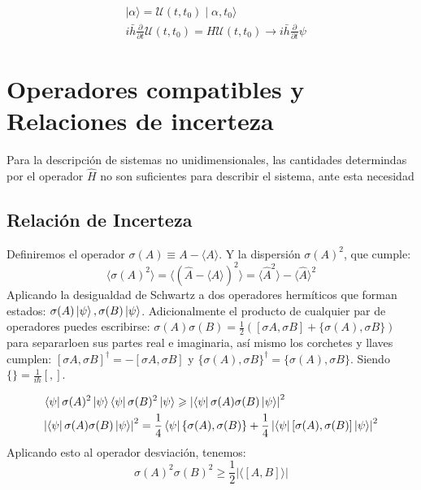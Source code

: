 \documentclass{report}
\begin{document}

\begin{align*}
    &\mid \alpha \rangle = \mathcal{U}(t,t_0) \mid \alpha,t_0 \rangle\\
    &i \bar{h}\frac{\partial}{\partial t} \mathcal{U}(t,t_0) =H\mathcal{U}(t,t_0) \rightarrow i \bar{h} \frac{\partial}{\partial t}\psi
\end{align*}

\chapter{Operadores compatibles y Relaciones de incerteza}
Para la descripción de sistemas no unidimensionales, las cantidades determindas por el operador $\hat{H}$ no son suficientes para describir el sistema, ante esta necesidad 
\section{Relación de Incerteza}
Definiremos el operador $\sigma(A)\equiv A- \langle A \rangle$. Y la dispersión $\sigma(A)^2$, que cumple:
\[
  \langle\sigma(A)^2\rangle= \langle(\hat{A}- \langle A\rangle)^2\rangle=\langle \hat{A}^2\rangle -\langle \hat{A} \rangle ^2
\]
Aplicando la desigualdad de Schwartz a dos operadores hermíticos que forman estados: $\sigma(A)\ket{\psi}, \sigma(B)\ket{\psi}$. Adicionalmente el producto de cualquier par de operadores puedes escribirse: $\sigma(A)\sigma(B)=\frac{1}{2}\left(\left[ \sigma{A},\sigma{B}\right]+\{\sigma(A),\sigma{B}\} \right)$ para separarloen sus partes real e imaginaria, así mismo los corchetes y llaves cumplen:  $\left[ \sigma{A},\sigma{B}\right]^\dagger=-\left[ \sigma{A},\sigma{B}\right]$ y $\{\sigma(A),\sigma{B}\}^\dagger=\{\sigma(A),\sigma{B}\}$. Siendo $\{  \}= \frac{1}{i \hbar } \left[ ,  \right]$.

\begin{align*}
  \bra{\psi}\sigma(A)^2\ket{\psi}\bra{\psi}\sigma(&B)^2\ket{\psi}\geqslant \left|\bra{\psi}\sigma(A)\sigma(B)\ket{\psi}\right|^2\\
  \left| \bra{\psi}\sigma(A)\sigma(B)\ket{\psi} \right|^2&=\frac{1}{4}\bra{\psi}\left\{ \sigma(A),\sigma(B)  \right\}+\frac{1}{4}\left| \bra{\psi}\left[ \sigma(A),\sigma(B)  \right] \ket{\psi} \right|^2\\
\end{align*}
Aplicando esto al operador desviación, tenemos:
\begin{equation}
\sigma(A)^2 \sigma(B)^2 \geq \frac{1}{2}\left| \langle \left[ A,B  \right] \rangle  \right| 
\end{equation}
\end{document}
